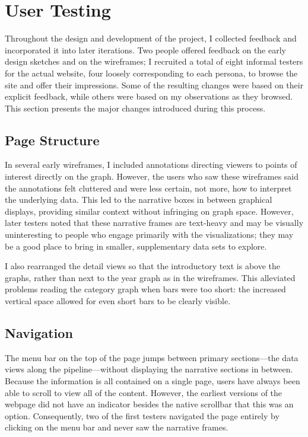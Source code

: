 {\color{magenta}

\section{User Testing}\label{sec:testing}
Throughout the design and development of the project, I collected feedback and incorporated it into later iterations. Two people offered feedback on the early design sketches and on the wireframes; I recruited a total of eight informal testers for the actual website, four loosely corresponding to each persona, to browse the site and offer their impressions. Some of the resulting changes were based on their explicit feedback, while others were based on my observations as they browsed. This section presents the major changes introduced during this process.

\subsection{Page Structure}
In several early wireframes, I included annotations directing viewers to points of interest directly on the graph. However, the users who saw these wireframes said the annotations felt cluttered and were less certain, not more, how to interpret the underlying data. This led to the narrative boxes in between graphical displays, providing similar context without infringing on graph space. However, later testers noted that these narrative frames are text-heavy and may be visually uninteresting to people who engage primarily with the visualizations; they may be a good place to bring in smaller, supplementary data sets to explore.

I also rearranged the detail views so that the introductory text is above the graphs, rather than next to the year graph as in the wireframes. This alleviated problems reading the category graph when bars were too short: the increased vertical space allowed for even short bars to be clearly visible.

\subsection{Navigation}
The menu bar on the top of the page jumps between primary sections---the data views along the pipeline---without displaying the narrative sections in between. Because the information is all contained on a single page, users have always been able to scroll to view all of the content. However, the earliest versions of the webpage did not have an indicator besides the native scrollbar that this was an option. Consequently, two of the first testers navigated the page entirely by clicking on the menu bar and never saw the narrative frames.

}

